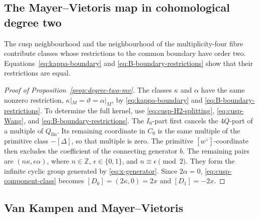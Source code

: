 \documentclass[11pt]{article}
\theoremstyle{definition}
\theoremstyle{remark}
\numberwithin{equation}{section}
\begin{document}
\subsection{The Mayer--Vietoris map in cohomological degree two}

The cusp neighbourhood and the neighbourhood of the multiplicity-four fibre
contribute classes whose restrictions to the common boundary have order two.
Equations~\eqref{eq:kappa-boundary}
and \eqref{eq:B-boundary-restrictions} show that their restrictions are equal.

\begin{proof}[Proof of Proposition~\ref{prop:degree-two-mv}]
The classes $\kappa$ and $\alpha$ have the same nonzero restriction,
$\kappa|_M=\vartheta=\alpha|_M$,
by \eqref{eq:kappa-boundary} and
\eqref{eq:B-boundary-restrictions}.  To determine the full kernel, use
\eqref{eq:cusp-H2-splitting}, \eqref{eq:cusp-Wang}, and
\eqref{eq:B-boundary-restrictions}.  The $I_0$-part first cancels the
$4Q$-part of a multiple of $Q_{\mathrm{fin}}$.  Its remaining coordinate in
$C_0$ is the same multiple of the primitive class $-[\Delta]$, so
that multiple is zero.  The primitive $[w^\vee]$-coordinate then excludes the
coefficient of the connecting generator $b$.  The remaining pairs are
$(n\kappa,\epsilon\alpha)$, where $n\in\mathbb Z$,
$\epsilon\in\{0,1\}$, and $n\equiv\epsilon\pmod2$.
They form the infinite cyclic group generated by
\eqref{eq:x-generator}.  Since $2\alpha=0$,
\eqref{eq:cusp-component-class} becomes
$[D_0]=(2\kappa,0)=2x$ and $[D_1]=-2x$.
\end{proof}

\subsection{Van Kampen and Mayer--Vietoris}
\end{document}
